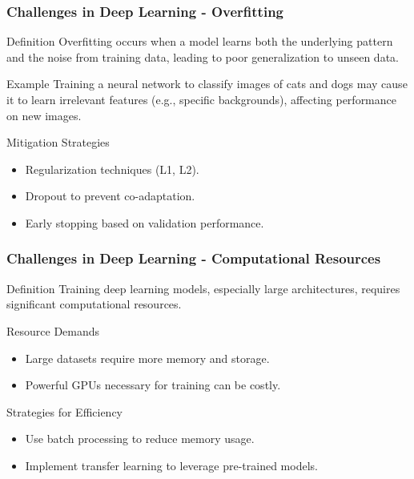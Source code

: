 \documentclass[aspectratio=169]{beamer}
\begin{document}
\begin{frame}[fragile]
    \frametitle{Challenges in Deep Learning - Overfitting}
    \begin{block}{Definition}
        Overfitting occurs when a model learns both the underlying pattern and the noise from training data, leading to poor generalization to unseen data.
    \end{block}

    \begin{block}{Example}
        Training a neural network to classify images of cats and dogs may cause it to learn irrelevant features (e.g., specific backgrounds), affecting performance on new images.
    \end{block}

    \begin{block}{Mitigation Strategies}
        \begin{itemize}
            \item Regularization techniques (L1, L2).
            \item Dropout to prevent co-adaptation.
            \item Early stopping based on validation performance.
        \end{itemize}
    \end{block}
\end{frame}

\begin{frame}[fragile]
    \frametitle{Challenges in Deep Learning - Computational Resources}
    \begin{block}{Definition}
        Training deep learning models, especially large architectures, requires significant computational resources.
    \end{block}

    \begin{block}{Resource Demands}
        \begin{itemize}
            \item Large datasets require more memory and storage.
            \item Powerful GPUs necessary for training can be costly.
        \end{itemize}
    \end{block}

    \begin{block}{Strategies for Efficiency}
        \begin{itemize}
            \item Use batch processing to reduce memory usage.
            \item Implement transfer learning to leverage pre-trained models.
        \end{itemize}
    \end{block}
\end{frame}
\end{document}
